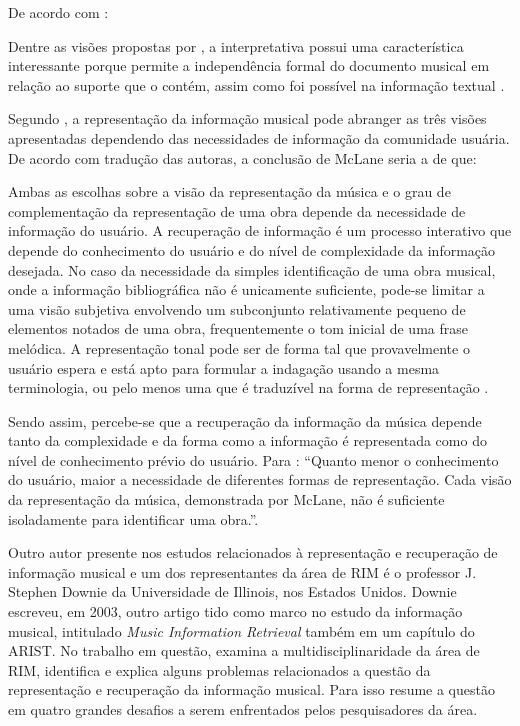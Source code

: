 De acordo com :

\begin{citacao}
Dentre as visões propostas por , a interpretativa possui uma característica interessante porque permite a independência formal do documento musical em relação ao suporte que o contém, assim como foi possível na informação textual \cite{cruz2014}.
\end{citacao}

Segundo , a representação da informação musical pode abranger as três visões apresentadas dependendo das necessidades de informação da comunidade usuária. De acordo com tradução das autoras, a conclusão de McLane seria a de que:

\begin{citacao}
Ambas as escolhas sobre a visão da representação da música e o grau de complementação da representação de uma obra depende da necessidade de informação do usuário. A recuperação de informação é um processo interativo que depende do conhecimento do usuário e do nível de complexidade da informação desejada. No caso da necessidade da simples identificação de uma obra musical, onde a informação bibliográfica não é unicamente suficiente, pode-se limitar a uma visão subjetiva envolvendo um subconjunto relativamente pequeno de elementos notados de uma obra, frequentemente o tom inicial de uma frase melódica. A representação tonal pode ser de forma tal que provavelmente o usuário espera e está apto para formular a indagação usando a mesma terminologia, ou pelo menos uma que é traduzível na forma de representação .
\end{citacao}

Sendo assim, percebe-se que a recuperação da informação da música depende tanto da complexidade e da forma como a informação é representada como do nível de conhecimento prévio do usuário. Para : “Quanto menor o conhecimento do usuário, maior a necessidade de diferentes formas de representação. Cada visão da representação da música, demonstrada por McLane, não é suficiente isoladamente para identificar uma obra.”.

Outro autor presente nos estudos relacionados à representação e recuperação de informação musical e um dos representantes da área de RIM é o professor J. Stephen Downie da Universidade de Illinois, nos Estados Unidos. Downie escreveu, em 2003, outro artigo tido como marco no estudo da informação musical, intitulado \textit{Music Information Retrieval} também em um capítulo do ARIST. No trabalho em questão,  examina a multidisciplinaridade da área de RIM, identifica e explica alguns problemas relacionados a questão da representação e recuperação da informação musical. Para isso  resume a questão em quatro grandes desafios a serem enfrentados pelos pesquisadores da área.

